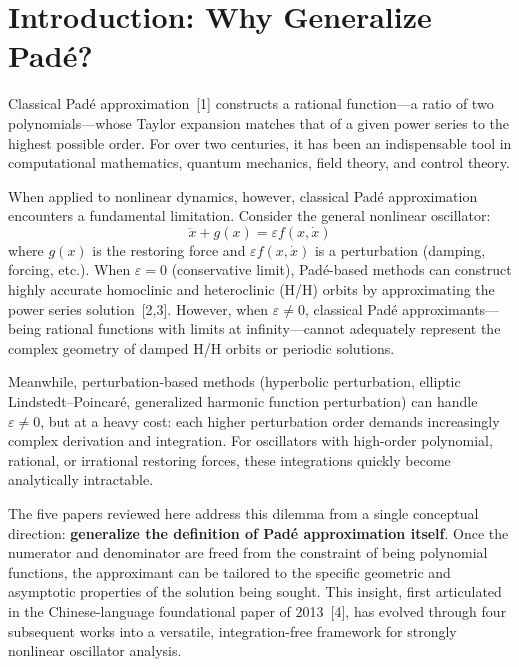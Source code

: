 \documentclass[11pt,a4paper]{article}
\begin{document}
\section{Introduction: Why Generalize Pad\'e?}

Classical Pad\'e approximation~[1] constructs a rational function---a ratio of two polynomials---whose Taylor expansion matches that of a given power series to the highest possible order. For over two centuries, it has been an indispensable tool in computational mathematics, quantum mechanics, field theory, and control theory.

When applied to nonlinear dynamics, however, classical Pad\'e approximation encounters a fundamental limitation. Consider the general nonlinear oscillator:
\begin{equation}
\ddot{x} + g(x) = \varepsilon f(x, \dot{x})
\label{eq:general}
\end{equation}
where $g(x)$ is the restoring force and $\varepsilon f(x, \dot{x})$ is a perturbation (damping, forcing, etc.). When $\varepsilon = 0$ (conservative limit), Pad\'e-based methods can construct highly accurate homoclinic and heteroclinic (H/H) orbits by approximating the power series solution~[2,3]. However, when $\varepsilon \neq 0$, classical Pad\'e approximants---being rational functions with limits at infinity---cannot adequately represent the complex geometry of damped H/H orbits or periodic solutions.

Meanwhile, perturbation-based methods (hyperbolic perturbation, elliptic Lindstedt--Poincar\'e, generalized harmonic function perturbation) can handle $\varepsilon \neq 0$, but at a heavy cost: each higher perturbation order demands increasingly complex derivation and integration. For oscillators with high-order polynomial, rational, or irrational restoring forces, these integrations quickly become analytically intractable.

The five papers reviewed here address this dilemma from a single conceptual direction: \textbf{generalize the definition of Pad\'e approximation itself}. Once the numerator and denominator are freed from the constraint of being polynomial functions, the approximant can be tailored to the specific geometric and asymptotic properties of the solution being sought. This insight, first articulated in the Chinese-language foundational paper of 2013~[4], has evolved through four subsequent works into a versatile, integration-free framework for strongly nonlinear oscillator analysis.
\end{document}
